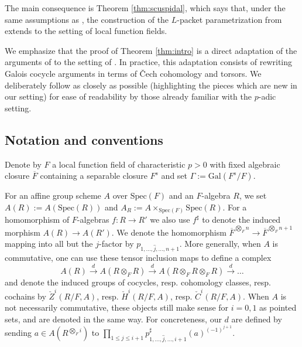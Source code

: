 \documentclass{amsart}
\theoremstyle{definition}
\theoremstyle{remark}
\newcommand\Spec{\mathrm{Spec}}
\newcommand{\ov}{\overline}
\begin{document}
The main consequence is Theorem \ref{thm:scuspidal}, which says that, under the same assumptions as \cite{Kal22}, the construction of the $L$-packet parametrization from \cite{Kal22} extends to the setting of local function fields.

We emphasize that the proof of Theorem \ref{thm:intro} is a direct adaptation of the arguments of \cite[\S 5]{Kal26b} to the setting of \cite{Dillery1}. In practice, this adaptation consists of rewriting Galois cocycle arguments in terms of \v{C}ech cohomology and torsors. We deliberately follow \cite[\S 5]{Kal26b} as closely as possible (highlighting the pieces which are new in our setting) for ease of readability by those already familiar with the $p$-adic setting.

\subsection{Notation and conventions}
Denote by $F$ a local function field of characteristic $p>0$ with fixed algebraic closure $\ov{F}$ containing a separable closure $F^{s}$ and set $\Gamma:=\text{Gal}(F^{s}/F)$.

For an affine group scheme $A$ over $\Spec(F)$ and an $F$-algebra $R$, we set $A(R):=A(\Spec(R))$ and $A_{R}:= A \times_{\Spec(F)} \Spec(R)$. For a homomorphism of $F$-algebras $f \colon R \to R'$ we also use $f^{\sharp}$ to denote the induced morphism $A(R) \to A(R')$. We denote the homomorphism $\ov{F}^{\bigotimes_{F}n} \to \ov{F}^{\bigotimes_{F}n+1}$ mapping into all but the $j$-factor by $p_{1,\dots,\hat{j},\dots,n+1}$. More generally, when $A$ is commutative, one can use these tensor inclusion maps to define a complex
\begin{equation*}
    A(R) \xrightarrow{d} A(R \otimes_{F} R) \xrightarrow{d} A(R \otimes_{F} R \otimes_{F} R) \xrightarrow{d} \dots
\end{equation*}
and denote the induced groups of cocycles, resp. cohomology classes, resp. cochains by $\check{Z}^{i}(R/F, A)$, resp. $\check{H}^{i}(R/F,A)$, resp. $\check{C}^{i}(R/F,A)$. When $A$ is not necessarily commutative, these objects still make sense for $i=0,1$ as pointed sets, and are denoted in the same way. For concreteness, our $d$ are defined by sending $a \in A(R^{\bigotimes_{F} i})$  to $\prod_{1 \leq j \leq i+1} p^{\sharp}_{1,\dots,\hat{j},\dots,i+1}(a)^{(-1)^{j+1}}$.
\end{document}
